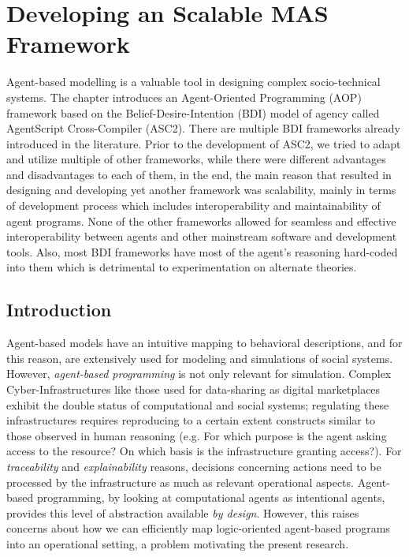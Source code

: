 


\chapter{Developing an Scalable MAS Framework}
\label{ch:asc2}
Agent-based modelling is a valuable tool in designing complex socio-technical systems. The chapter introduces an Agent-Oriented Programming (AOP) framework based on the Belief-Desire-Intention (BDI) model of agency called AgentScript Cross-Compiler (ASC2). There are multiple BDI frameworks already introduced in the literature. Prior to the development of ASC2, we tried to adapt and utilize multiple of other frameworks, while there were different advantages and disadvantages to each of them, in the end, the main reason that resulted in designing and developing yet another framework was scalability, mainly in terms of development process which includes interoperability and maintainability of agent programs. None of the other frameworks allowed for seamless and effective interoperability between agents and other mainstream software and development tools. Also, most BDI frameworks have most of the agent's reasoning hard-coded into them which is detrimental to experimentation on alternate theories.




\section{Introduction}
Agent-based models have an intuitive mapping to behavioral descriptions, and for this reason, are extensively used for modeling and simulations of social systems. However, \textit{agent-based programming} is not only relevant for simulation. Complex Cyber-Infrastructures like those used for data-sharing as digital marketplaces exhibit the double status of computational and social systems; regulating these infrastructures requires reproducing to a certain extent constructs similar to those observed in human reasoning (e.g. For which purpose is the agent asking access to the resource? On which basis is the infrastructure granting access?). For \textit{traceability} and \textit{explainability} reasons, decisions concerning actions need to be processed by the infrastructure as much as relevant operational aspects. Agent-based programming, by looking at computational agents as intentional agents, provides this level of abstraction available \textit{by design}. However, this raises concerns about how we can efficiently map logic-oriented agent-based programs into an operational setting, a problem motivating the present research.


